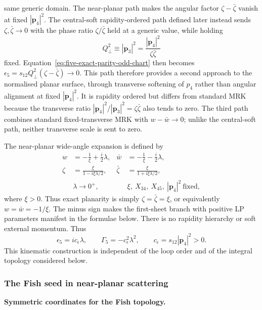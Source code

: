 \documentclass[a4paper,11pt]{article}
\begin{document}
same generic domain.  The near-planar path makes the angular factor
\(\zeta-\bar\zeta\) vanish at fixed \(|\mathbf p_4|^2\).  The central-soft
rapidity-ordered path defined later instead sends
\(\zeta,\bar\zeta\to0\) with the phase ratio \(\zeta/\bar\zeta\) held at a
generic value, while holding
\[
 Q_\perp^2\equiv |\mathbf p_3|^2
 =\frac{|\mathbf p_4|^2}{\zeta\bar\zeta}
\]
fixed.  Equation~\eqref{eq:five-exact-parity-odd-chart} then becomes
\(\epsilon_5=s_{12}Q_\perp^2(\zeta-\bar\zeta)\to0\).  This path therefore
provides a second approach to the normalised planar surface, through
transverse softening of \(p_4\) rather than angular alignment at fixed
\(|\mathbf p_4|^2\).  It is rapidity ordered but differs from standard MRK
because the transverse ratio
\(|\mathbf p_4|^2/|\mathbf p_3|^2=\zeta\bar\zeta\) also tends to zero.  The
third path combines standard fixed-transverse MRK with \(w-\bar w\to0\);
unlike the central-soft path, neither transverse scale is sent to zero.

The near-planar wide-angle expansion is defined by
\begin{align}
 w&=-\frac1\xi+\frac{i}{2}\lambda,&
 \bar w&=-\frac1\xi-\frac{i}{2}\lambda,\nonumber\\
 \zeta&=\frac{\xi}{1-i\xi\lambda/2},&
 \bar\zeta&=\frac{\xi}{1+i\xi\lambda/2},\nonumber\\
 &\lambda\to0^+,&
 &\xi,\ X_{34},\ X_{45},\ |\mathbf p_4|^2\ \text{fixed},
 \label{eq:five-near-planar-chart}
\end{align}
where \(\xi>0\).  Thus exact planarity is simply
\(\zeta=\bar\zeta=\xi\), or equivalently
\(w=\bar w=-1/\xi\).  The minus sign makes the first-sheet branch with
positive LP parameters manifest in the formulae below.
There is no rapidity hierarchy or soft external momentum.  Thus
\begin{equation}
 \epsilon_5=i c_\epsilon\lambda,\qquad
 \Gamma_5=-c_\epsilon^2\lambda^2,\qquad
 c_\epsilon=s_{12}|\mathbf p_4|^2>0.
 \label{eq:five-near-planar-limit}
\end{equation}
This kinematic construction is independent of the loop order and of the
integral topology considered below.

\subsubsection{The Fish seed in near-planar scattering}
\label{sec:five-point-near-planar-seed}

\medskip
\noindent\textbf{Symmetric coordinates for the Fish topology.}\par\smallskip
\end{document}
